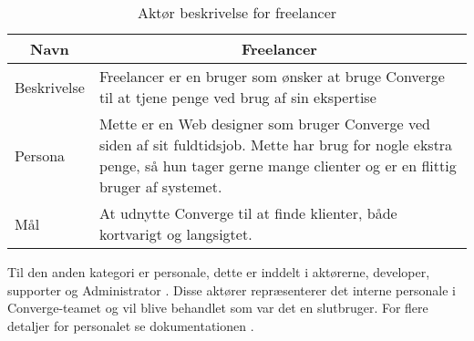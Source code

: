 \begin{table}[H]
    \begin{small}
        \caption{Aktør beskrivelse for freelancer}
        \label{tab:freelancer}
        \begin{center}
            \begin{tabular}[c]{p{3cm}|p{8cm}}
                \multicolumn{1}{c|}{\textbf{Navn}} & \multicolumn{1}{c}{\textbf{Freelancer}}                                                                                                                                                                            \\
                \hline
                Beskrivelse                        & \multicolumn{1}{p{10cm}}{Freelancer er en bruger som ønsker at bruge Converge til at tjene penge ved brug af sin ekspertise}                                                                                       \\
                \hline
                Persona                            & \multicolumn{1}{p{10cm}}{Mette er en Web designer som bruger Converge ved siden af sit fuldtidsjob. Mette har brug for nogle ekstra penge, så hun tager gerne mange clienter og er en flittig bruger af systemet.} \\
                \hline
                Mål                                & \multicolumn{1}{p{10cm}}{At udnytte Converge til at finde klienter, både kortvarigt og langsigtet.}                                                                                                                \\
            \end{tabular}
        \end{center}
    \end{small}
\end{table}

Til den anden kategori er personale, dette er inddelt i aktørerne, developer, supporter og Administrator \cite[Personale]{converge-terms}. Disse aktører repræsenterer det interne personale i Converge-teamet og vil blive behandlet som var det en slutbruger. For flere detaljer for personalet se dokumentationen \cite[Funktionelle krav]{documentation-kravspec}. 
